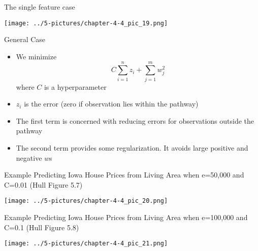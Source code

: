 \documentclass[11pt]{beamer}
\begin{document}
\begin{frame}{The single feature case}
	\begin{center}
	\texttt{[image: ../5-pictures/chapter-4-4\_pic\_19.png]}
	\end{center}
\end{frame}
\begin{frame}{General Case}
	\begin{itemize}
		\item We minimize $$C \sum\limits_{i=1}^n z_i + \sum\limits_{j=1}^m w_j^2$$   where $C$ is a hyperparameter
		\item $z_i$ is the error (zero if observation lies within the pathway)
		\item The first term is concerned with reducing errors for observations outside the pathway
		\item The second term provides some regularization. It avoids large positive and negative $w$s
	\end{itemize}
\end{frame}
\begin{frame}{Example}
	Predicting Iowa House Prices from Living Area when e=50,000 and C=0.01 (Hull Figure 5.7)
	\begin{center}
	\texttt{[image: ../5-pictures/chapter-4-4\_pic\_20.png]}
	\end{center}
\end{frame}
\begin{frame}{Example}
	Predicting Iowa House Prices from Living Area when e=100,000 and C=0.1 (Hull Figure 5.8)
	\begin{center}
	\texttt{[image: ../5-pictures/chapter-4-4\_pic\_21.png]}
	\end{center}
\end{frame}
\end{document}

